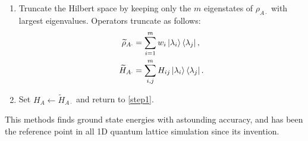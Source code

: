 \begin{enumerate}
  \item Truncate the Hilbert space by keeping only the $m$ eigenstates of
  $\rho_{A \cdot}$ with largest eigenvalues. Operators truncate as follows:
  \begin{align}
    \widetilde{\rho}_{A \cdot} & = \sum_{i = 1}^{m} w_i \ket{\lambda_i}\bra{\lambda_j}, \\
    \widetilde{H}_{A \cdot} & = \sum_{i, j}^{m} H_{ij} \ket{\lambda_i}\bra{\lambda_j}.
  \end{align}

  \item Set $H_{A} \leftarrow \widetilde{H}_{A \cdot}$ and return to \ref{step1}.

\end{enumerate}


This methods finds ground state energies with astounding accuracy, and has been
the reference point in all 1D quantum lattice simulation since its invention.
